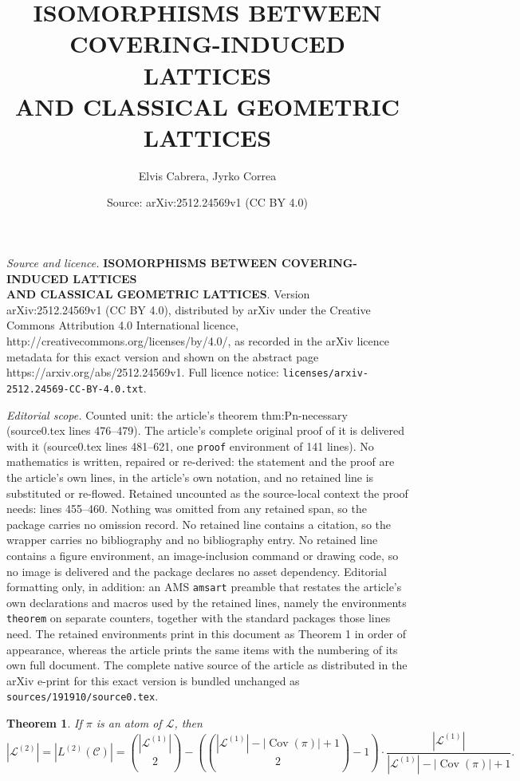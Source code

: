 \documentclass[10pt,a4paper]{amsart}
\title{\textbf{ISOMORPHISMS BETWEEN COVERING-INDUCED LATTICES \\ AND CLASSICAL GEOMETRIC LATTICES}}
\author{Elvis Cabrera, Jyrko Correa}
\date{Source: arXiv:2512.24569v1 (CC BY 4.0)}
\newtheorem{theorem}{Theorem}
\begin{document}
\maketitle

\noindent\emph{Source and licence.} \textbf{ISOMORPHISMS BETWEEN COVERING-INDUCED LATTICES \\ AND CLASSICAL GEOMETRIC LATTICES}. Version arXiv:2512.24569v1 (CC BY 4.0), distributed by arXiv under the Creative Commons Attribution 4.0 International licence, http://creativecommons.org/licenses/by/4.0/, as recorded in the arXiv licence metadata for this exact version and shown on the abstract page https://arxiv.org/abs/2512.24569v1. Full licence notice: \texttt{licenses/arxiv-2512.24569-CC-BY-4.0.txt}.\par\smallskip

\noindent\textit{Editorial scope.} Counted unit: the article's theorem thm:Pn-necessary (source0.tex lines 476--479). The article's complete original proof of it is delivered with it (source0.tex lines 481--621, one \texttt{proof} environment of 141 lines). No mathematics is written, repaired or re-derived: the statement and the proof are the article's own lines, in the article's own notation, and no retained line is substituted or re-flowed.  Retained uncounted as the source-local context the proof needs: lines 455--460.  Nothing was omitted from any retained span, so the package carries no omission record.  No retained line contains a citation, so the wrapper carries no bibliography and no bibliography entry.  No retained line contains a figure environment, an image-inclusion command or drawing code, so no image is delivered and the package declares no asset dependency.  Editorial formatting only, in addition: an AMS \texttt{amsart} preamble that restates the article's own declarations and macros used by the retained lines, namely the environments \texttt{theorem} on separate counters, together with the standard packages those lines need.  The retained environments print in this document as Theorem 1 in order of appearance, whereas the article prints the same items with the numbering of its own full document.  The complete native source of the article as distributed in the arXiv e-print for this exact version is bundled unchanged as \texttt{sources/191910/source0.tex}.
\begin{theorem}\label{counting}
    If $\pi$ is an atom of $\mathcal{L}$, then
    \[
    |\mathcal{L}^{(2)}| = |L^{(2)}(\mathcal{C})| = \binom{|\mathcal{L}^{(1)}|}{2} - \left(\binom{|\mathcal{L}^{(1)}| - |\operatorname{Cov}(\pi)| + 1}{2} - 1\right) \cdot \frac{|\mathcal{L}^{(1)}|}{|\mathcal{L}^{(1)}| - |\operatorname{Cov}(\pi)| + 1}.
    \]
\end{theorem}
\end{document}

